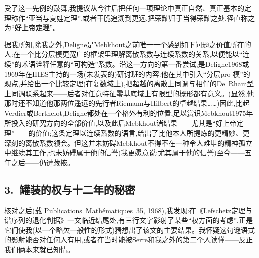 受了这一先例的鼓舞,我提议从今往后把任何一项理论中真正自然、真正基本的定理称作“亚当与夏娃定理”,或者干脆追溯到更远,把荣耀归于当得荣耀之处,径直称之为“\textbf{好上帝定理}”。

\pmark 据我所知,除我之外,Deligne是Mebkhout之前唯一一个感到如下问题之价值所在的人:在一个比分层模更宽广的框架里理解离散系数与连续系数的关系,以便能以“连续”的术语诠释任意的“可构造”系数。沿这一方向的第一番尝试,是Deligne1968或1969年在IHES主持的一场(未发表的)研讨班的内容:他在其中引入“分层pro-模”的观点,并给出一个比较定理(在复数域上),把超越的离散上同调与相伴的De~Rham型上同调联系起来——后者对任意特征零基底域上有限型的概形都有意义。(显然,他那时还不知道他那两位遥远的先行者Riemann与Hilbert的卓越结果……)因此,比起Verdier或Berthelot,Deligne都处在一个格外有利的位置,足以赏识Mebkhout1975年所投入的研究方向的全部价值,以及此后Mebkhout诸结果——尤其是“好上帝定理”——的价值;这条定理以连续系数的语言,给出了比他本人所提炼的更精妙、更深刻的离散系数领会。但这并未妨碍Mebkhout不得不在一种令人难堪的精神孤立中继续其工作,也未妨碍属于他的信誉(我更愿意说:尤其属于他的信誉)至今——五年之后——仍遭藏掖。

\subsection{3.~罐装的权与十二年的秘密}


\pmark 核对之后(载 Publications~Mathématiques~35, 1968),我发现:在《Lefschetz定理与谱序列的退化判据》一文临近结尾处,有三行文字影射了某些“权方面的考虑”,正是它们使我(以一个略欠一般性的形式)猜想出了该文的主要结果。我怀疑这句谜语式的影射能否对任何人有用,或者在当时能被Serre和我之外的第二个人读懂——反正我们俩本来就已知情。


